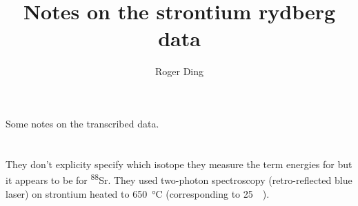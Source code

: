 \documentclass{article}
\title{Notes on the strontium rydberg data}
\author{Roger Ding}
\newcommand{\tsup}{\textsuperscript}													%
\newcommand{\Sr}[1]{\tsup{#1}\textnormal{Sr}}											%
\begin{document}
\maketitle


Some notes on the transcribed data.

\section{}

They don't explicity specify which isotope they measure the term energies for but it appears to be for \Sr{88}. They used two-photon spectroscopy (retro-reflected blue laser) on strontium heated to \SI{650}{\celsius} (corresponding to \SI{25}{\milli\Torr}). 

 
 
\printbibliography
\end{document}
